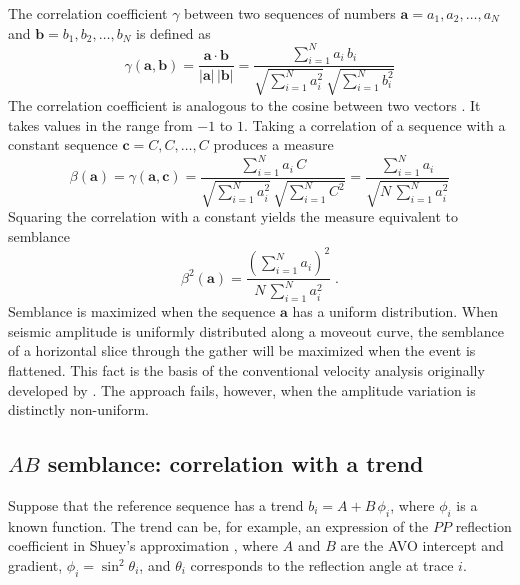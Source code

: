 The correlation coefficient $\gamma$ between two sequences of numbers
$\mathbf{a}=a_1,a_2,\ldots,a_N$ and $\mathbf{b}=b_1,b_2,\ldots,b_N$
is defined as
\begin{equation}
\label{eq:alpha}
\gamma(\mathbf{a},\mathbf{b}) = 
\frac{\mathbf{a} \cdot \mathbf{b}}{|\mathbf{a}|\,|\mathbf{b}|} =
\frac{\displaystyle \sum_{i=1}^N a_i\,b_i}{
\displaystyle \sqrt{\sum_{i=1}^{N} a_i^2}\,\sqrt{\sum_{i=1}^{N} b_i^2}}
\end{equation}
The correlation coefficient is analogous to the cosine
  between two vectors . It takes
values in the range from $-1$ to $1$.  Taking a correlation of a
sequence  with a constant sequence
$\mathbf{c}=C,C,\ldots,C$ produces a measure 
\begin{equation}
\label{eq:beta}
\beta(\mathbf{a}) = \gamma(\mathbf{a},\mathbf{c}) =
\frac{\displaystyle \sum_{i=1}^N a_i\,C}{
\displaystyle \sqrt{\sum_{i=1}^{N} a_i^2}\,\sqrt{\sum_{i=1}^{N} C^2}}
= \frac{\displaystyle \sum_{i=1}^N a_i}{
\displaystyle \sqrt{N\,\sum_{i=1}^{N} a_i^2}}
\end{equation}
Squaring the correlation with a constant yields the measure equivalent
to semblance 
\begin{equation}
\label{eq:semb}
\beta^2(\mathbf{a}) = 
\frac{\displaystyle \left(\sum_{i=1}^N a_i\right)^2}{
\displaystyle N\,\sum_{i=1}^{N} a_i^2}\;.
\end{equation}
Semblance is maximized when the sequence $\mathbf{a}$ has a uniform
distribution. When seismic amplitude is uniformly distributed along a
moveout curve, the semblance of a horizontal slice through the gather
will be maximized when the event is flattened. This fact is the basis
of the conventional velocity analysis originally developed by
\cite{GEO34-06-08590881}. The approach fails, however, when the 
amplitude variation is distinctly non-uniform.

\subsection{$AB$ semblance: correlation with a trend}

Suppose that the reference sequence has a trend $b_i = A + B\,\phi_i$,
where $\phi_i$ is a known function. The trend can be, for example, an
expression of the $PP$ reflection coefficient in Shuey's approximation
\cite[]{GEO50-04-06090614}, where $A$ and $B$ are the AVO intercept
and gradient, $\phi_i=\sin^2{\theta_i}$, and $\theta_i$ corresponds to
the reflection angle at trace $i$. 


